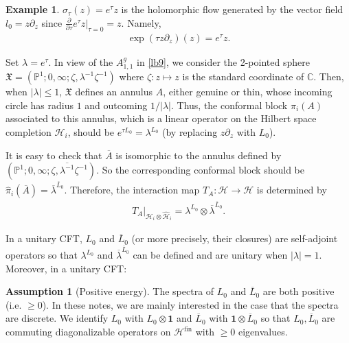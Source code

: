 \documentclass[12pt,a4paper,notitlepage]{article}
\theoremstyle{definition}
\newtheorem{eg}[df]{Example}
\newtheorem{ass}[df]{Assumption}
\theoremstyle{plain}
\newcommand{\fk}{\mathfrak}
\newcommand{\mc}{\mathcal}
\newcommand{\wht}{\widehat}
\newcommand{\ovl}{\overline}
\newcommand{\id}{\mathbf{1}}
\newcommand{\Cbb}{\mathbb C}
\newcommand{\Pbb}{\mathbb P}
\newcommand{\fin}{\mathrm{fin}}
\numberwithin{equation}{section}
\begin{document}
\subsection{}\label{lb10}

\begin{eg}\label{lb14}
$\sigma_\tau(z)=e^{\tau}z$ is the holomorphic flow generated by the vector field $l_0=z\partial_z$ since $\frac\partial{\partial\tau}e^\tau z|_{\tau=0}=z$. Namely,
\begin{align*}
\exp(\tau z\partial_z)(z)=e^\tau z.	
\end{align*}
\end{eg}



Set $\lambda=e^\tau$. In view of the  $A_{1,1}^g$ in \ref{lb9}, we consider the 2-pointed sphere $\fk X=(\Pbb^1;0,\infty;\zeta,\lambda^{-1}\zeta^{-1})$ where $\zeta:z\mapsto z$ is the standard coordinate of $\Cbb$. Then, when $|\lambda|\leq 1$, $\fk X$ defines an annulus $A$, either genuine or thin, whose incoming circle has radius $1$ and outcoming $1/|\lambda|$. Thus, the conformal block $\pi_i(A)$ associated to this annulus, which is a linear operator on the Hilbert space completion $\mc H_i$, should be $e^{\tau L_0}=\lambda^{L_0}$ (by replacing $z\partial_z$ with $L_0$). 

It is easy to check that $\ovl A$ is isomorphic to the annulus defined by $(\Pbb^1;0,\infty;\zeta,\ovl{\lambda^{-1}}\zeta^{-1})$. So the corresponding conformal block should be $\wht\pi_i(\ovl A)=\ovl\lambda^{\ovl L_0}$. Therefore, the interaction map $T_A:\mc H\rightarrow\mc H$ is determined by
\begin{align}
	T_A\big|_{\mc H_i\otimes\wht{\mc H}_i}=\lambda^{L_0}\otimes\ovl\lambda^{\ovl L_0}.	\label{eq9}
\end{align}

In a unitary CFT, $L_0$ and $\ovl L_0$ (or more precisely, their closures) are self-adjoint operators so that $\lambda^{L_0}$ and $\ovl\lambda^{\ovl L_0}$ can be defined and are unitary when $|\lambda|=1$. Moreover, in a unitary CFT:
\begin{ass}[Positive energy]\label{lb18}
The spectra of $L_0$ and $\ovl L_0$ are both positive (i.e. $\geq 0$). In these notes, we are mainly interested in the case that the spectra are discrete. We identify $L_0$ with $L_0\otimes\id$ and $\ovl L_0$ with $\id\otimes\ovl L_0$ so that $L_0,\ovl L_0$ are commuting diagonalizable operators on $\mc H^\fin$ with $\geq0$ eigenvalues.
\end{ass}
\end{document}
